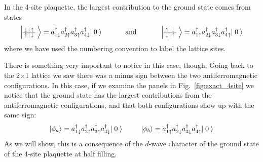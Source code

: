 In the 4-site plaquette,  the largest contribution to the ground state comes
from states 
\begin{equation}
\arraycolsep=1.0pt\def\arraystretch{0.6}
  \left|
  \scalebox{0.75}{$ 
  \begin{array}{c|c}
    \nspdn & \nspup \\ \hline
    \nspup & \nspdn \\ \end{array}$ } \right\rangle =  
   a_{1\spdn}^{\dagger} a_{2\spup}^{\dagger} 
   a_{3\spup}^{\dagger} a_{4\spdn}^{\dagger} |\nvac\rangle
  ~~~~~~~~~~\text{and}~~~~~~~~~~
  \left|
  \scalebox{0.75}{$ 
  \begin{array}{c|c}
    \nspup & \nspdn \\ \hline
    \nspdn & \nspup \\ \end{array}$ } \right\rangle = 
   a_{1\spup}^{\dagger} a_{2\spdn}^{\dagger} 
   a_{3\spdn}^{\dagger} a_{4\spup}^{\dagger} |\nvac\rangle
\end{equation} 
where we have used the numbering convention
 to label the lattice sites.

There is something very important to notice in this case, though.  Going back
to the 2$\times$1 lattice we saw there was a minus sign between the two
antiferromagnetic configurations.  In this case, if we examine the panels in
Fig.~\ref{fig:exact_4site} we notice that the ground state has the largest
contributions from the antiferromagnetic configurations,  and that both
configurations show up with the same sign: 
\begin{equation} 
| \phi_{a} \rangle = 
   a_{1\spdn}^{\dagger} a_{2\spup}^{\dagger} 
   a_{3\spup}^{\dagger} a_{4\spdn}^{\dagger} |\nvac\rangle 
  ~~~~~~~~ 
|  \phi_{b} \rangle = 
   a_{1\spup}^{\dagger} a_{2\spdn}^{\dagger} 
   a_{3\spdn}^{\dagger} a_{4\spup}^{\dagger} |\nvac\rangle
\end{equation} 
As we will show, this is a consequence of the $d$-wave character of the ground
state of the 4-site plaquette at half filling.
 
